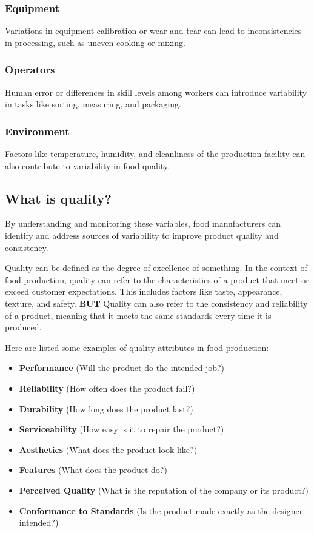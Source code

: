 \subsubsection*{Equipment}
Variations in equipment calibration or wear and tear can lead to inconsistencies in processing, such as uneven cooking or mixing.

\subsubsection*{Operators}  
Human error or differences in skill levels among workers can introduce variability in tasks like sorting, measuring, and packaging.

\subsubsection*{Environment}
Factors like temperature, humidity, and cleanliness of the production facility can also contribute to variability in food quality.

\subsection{What is quality?}
By understanding and monitoring these variables, food manufacturers can identify and address sources of variability to improve product quality and consistency.

Quality can be defined as the degree of excellence of something. In the context of food production, quality can refer to the characteristics of a product that meet or exceed customer expectations. This includes factors like taste, appearance, texture, and safety. \textbf{BUT} Quality can also refer to the consistency and reliability of a product, meaning that it meets the same standards every time it is produced.

Here are listed some examples of quality attributes in food production:

\begin{highlight}
    \begin{itemize}
        \item \textbf{Performance} (Will the product do the intended job?)
        \item \textbf{Reliability} (How often does the product fail?)
        \item \textbf{Durability} (How long does the product last?)
        \item \textbf{Serviceability} (How easy is it to repair the product?)
        \item \textbf{Aesthetics} (What does the product look like?)
        \item \textbf{Features} (What does the product do?)
        \item \textbf{Perceived Quality} (What is the reputation of the company or its product?)
        \item \textbf{Conformance to Standards} (Is the product made exactly as the designer intended?)
    \end{itemize}
\end{highlight}

